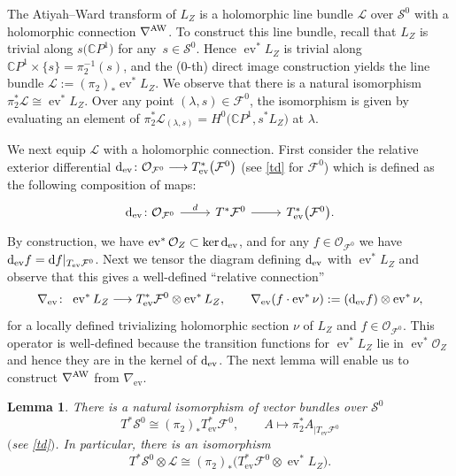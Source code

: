 \documentclass[pdftex]{sigma}
\numberwithin{equation}{section}
\newtheorem{Lemma}[Theorem]{Lemma}
\theoremstyle{definition}
\newcommand\C{{\mathbb C}}
\begin{document}
The Atiyah--Ward transform of $L_Z$ is a holomorphic line bundle $\mathcal{L}$ over $\mathcal{S}^0$ with a
holomorphic connection $\nabla^{\rm AW}$. To construct this line bundle, recall that $L_Z$ is trivial along $s\bigl(\C P^1\bigr)$
for any~${s \in \mathcal S^0}$. Hence $\operatorname{ev}^*L_Z$ is trivial along $\C P^1\times\{s\} = \pi_2^{-1}(s)$, and the
($0$-th) direct image construction yields the line bundle
$\mathcal L := (\pi_2)_*\operatorname{ev}^*L_Z$.
We observe that there is a natural isomorphism $\pi_2^*\mathcal{L} \cong \operatorname{ev}^*L_Z$. Over any point $(\lambda, s) \in
 \mathcal{F}^0$, the isomorphism is given by evaluating an element of $\pi_2^*\mathcal{L}_{(\lambda, s)} =
 H^0\bigl(\C P^1, s^*L_Z\bigr)$ at $\lambda$.

We next equip $\mathcal{L}$ with a holomorphic connection.
First consider the relative exterior differential ${\rm d}_{\operatorname{ev}}\colon \mathcal O_{\mathcal F^0}
\longrightarrow T^*_{\operatorname{ev}}\bigl(\mathcal F^0\bigr)$ \big(see \eqref{td} for ${\mathcal F}^0$\big) which is defined as the
following composition of maps:
\[
\begin{tikzcd}
{\rm d}_{\operatorname{ev}} \colon \mathcal O_{\mathcal F^0} \arrow[r, "d"] & T^*\mathcal F^0 \arrow[r] & T^*_{\operatorname{ev}}\bigl(\mathcal F^0\bigr).
\end{tikzcd}
\]
By construction, we have $\operatorname{ev}^*\mathcal O_Z \subset \ker {\rm d}_{\operatorname{ev}}$, and for any $f
 \in \mathcal O_{\mathcal F^0}$ we have
$
{\rm d}_{\operatorname{ev}}f = {\rm d}f|_{T_{\operatorname{ev}}\mathcal F^0}$.
Next we tensor the diagram defining ${\rm d}_{\operatorname{ev}}$ with $\operatorname{ev}^*L_Z$ and observe that this gives a well-defined ``relative connection''
\[\nabla_{\operatorname{ev}} \colon\ \operatorname{ev}^*L_Z \longrightarrow T^*_{\operatorname{ev}}\mathcal F^0 \otimes
\operatorname{ev}^*L_Z,\qquad
\nabla_{\operatorname{ev}}(f\cdot\operatorname{ev}^*\nu) := ({\rm d}_{\operatorname{ev}}f)\otimes\operatorname{ev}^*\nu,
\]
for a locally defined trivializing holomorphic section $\nu$ of $L_Z$ and $f \in \mathcal O_{\mathcal F^0}$.
This operator is well-defined because the transition functions for $\operatorname{ev}^*L_Z$ lie in $\operatorname{ev}^*\mathcal O_Z$
and hence they are in the kernel of ${\rm d}_{\operatorname{ev}}$.
The next lemma will enable us to construct $\nabla^{\rm AW}$ from $\nabla_{\operatorname{ev}}$.

\begin{Lemma}\label{isoS0}
There is a natural isomorphism of vector bundles over $\mathcal S^0$
\[
T^*\mathcal S^0 \cong (\pi_2)_* T^*_{\operatorname{ev}}\mathcal F^0, \qquad A \longmapsto
\pi_2^*A_{|T_{\operatorname{ev}}\mathcal{F}^0}
\]
$($see \eqref{td}$)$. In particular, there is an isomorphism
\[
T^*\mathcal{S}^0 \otimes \mathcal{L} \cong (\pi_2)_* \bigl(T^*_{\operatorname{ev}}\mathcal F^0 \otimes \operatorname{ev}^*L_Z\bigr).
\]
\end{Lemma}
\end{document}
